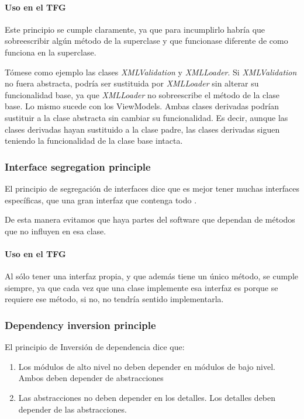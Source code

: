 \paragraph{Uso en el TFG}
Este principio se cumple claramente, ya que para incumplirlo habr\'ia que sobreescribir alg\'un m\'etodo de la superclase
y que funcionase diferente de como funciona en la superclase. 

T\'omese como ejemplo las clases \emph{XMLValidation} y \emph{XMLLoader}.
Si \emph{XMLValidation} no fuera abstracta, podr\'ia ser sustituida por \emph{XMLLoader}
sin alterar su funcionalidad base, ya que \emph{XMLLoader} no sobreescribe el m\'etodo de la clase base. Lo mismo
sucede con los ViewModels. Ambas clases derivadas podr\'ian sustituir a la clase abstracta sin cambiar su funcionalidad. Es
decir, aunque las clases derivadas hayan sustituido a la clase padre, las clases derivadas siguen teniendo la funcionalidad
de la clase base intacta.

\subsubsection{Interface segregation principle}
El principio de segregaci\'{o}n de interfaces dice que es mejor tener muchas interfaces espec\'{i}ficas, 
que una gran interfaz que contenga todo \cite{SOLID:ISP}.

De esta manera evitamos que haya partes del software que dependan de m\'{e}todos que no influyen en esa clase.

\paragraph{Uso en el TFG}
Al s\'olo tener una interfaz propia, y que adem\'as tiene un \'unico m\'etodo, se cumple siempre, ya que
cada vez que una clase implemente esa interfaz es porque se requiere ese m\'etodo, si no, no tendr\'ia sentido
implementarla.

\subsubsection{Dependency inversion principle}
El principio de Inversi\'{o}n de dependencia \cite{SOLID:DIP} dice que:
\begin{enumerate}
    \item Los m\'{o}dulos de alto nivel no deben depender en m\'{o}dulos de bajo nivel. Ambos deben depender de abstracciones
    \item Las abstracciones no deben depender en los detalles. Los detalles deben depender de las abstracciones.
\end{enumerate}

